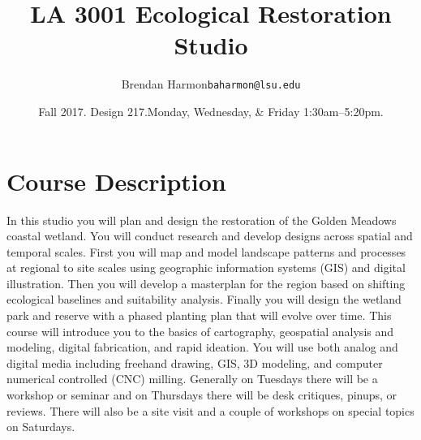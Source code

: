 \documentclass[11pt,article,oneside]{memoir}
\makeatletter
\def\myauthor{Author}
\def\mytitle{Title}
\def\myemail{baharmon@lsu.edu} %
\def\myauthor{Brendan Harmon}
\def\mytitle{{\normalsize \textsc{LA} 3001\newline} \huge \bfseries 
Ecological Restoration Studio}
\makeatother
\begin{document}
\setlength\bibitemsep{0.75em}

\setmainfont[Scale=1, Path = fonts/lato/,BoldItalicFont=Lato-RegIta,BoldFont=Lato-Reg,ItalicFont=Lato-LigIta]{Lato-Lig}
\setsansfont[Scale=1, Path = fonts/lato/,BoldItalicFont=Lato-RegIta,BoldFont=Lato-Reg,ItalicFont=Lato-LigIta]{Lato-Lig}
\setmonofont[Mapping=tex-text,Scale=0.8,Path = fonts/inconsolata/]{i}

\def\ind{\hangindent=1 true cm\hangafter=1 \noindent}
\def\labelitemi{$\cdot$}
\title{\LARGE \mytitle}     
\author{\Large\myauthor \newline \footnotesize\texttt{\noindent\myemail}}
\date{Fall 2017. Design 217.\newline Monday, Wednesday, \& Friday 1:30am--5:20pm.}
\published{\,}



%
%




\maketitle

\section{Course Description}

In this studio you will plan and design the restoration 
of the Golden Meadows coastal wetland. 
%
You will conduct research and develop designs 
across spatial and temporal scales.
%
First you will map and model landscape patterns and processes 
at regional to site scales using geographic information systems (GIS) 
and digital illustration. 
Then you will develop a masterplan for the region based on
shifting ecological baselines and suitability analysis.
Finally you will design the wetland park and reserve
with a phased planting plan that will evolve over time. 
%
This course will introduce you to the basics of cartography, 
geospatial analysis and modeling, digital fabrication,
and rapid ideation.
You will use both analog and digital media including
freehand drawing, GIS, 3D modeling, 
and computer numerical controlled (CNC) milling.
Generally on Tuesdays there will be a workshop or seminar
and on Thursdays there will be desk critiques, pinups, or reviews. 
There will also be a site visit 
and a couple of workshops on special topics on Saturdays.\\
\end{document}
